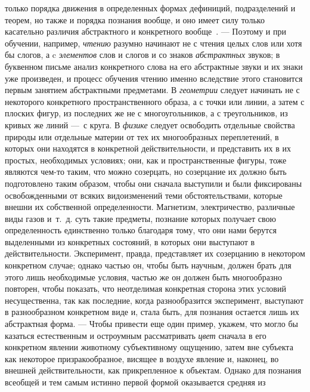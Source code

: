 \documentclass[twoside]{article}
\begin{document}
только порядка движения в определенных формах дефиниций, подразделений и
теорем, но также и порядка познания вообще, и оно имеет силу только
касательно различия абстрактного и конкретного
вообще~\label{bkm:bm106}.
— Поэтому и при обучении, например,
{\em чтению} разумно
начинают не с чтения целых слов или хотя бы слогов, а c
{\em элементов} слов и
слогов и со знаков {\em абстрактных}
звуков; в буквенном письме анализ конкретного слова на его
абстрактные звуки и их знаки уже произведен, и процесс обучения чтению
именно вследствие этого становится первым занятием абстрактными предметами.
В {\em геометрии} следует
начинать не с некоторого конкретного пространственного образа, а с точки
или линии, а затем с плоских фигур, из последних же не с многоугольников, а
с треугольников, из кривых же линий —~с круга. В
{\em физике} следует
освободить отдельные свойства природы или отдельные материи от тех их
многообразных переплетений, в которых они находятся в конкретной
действительности, и представить их в их простых, необходимых условиях; они,
как и пространственные фигуры, тоже являются чем-то таким, что можно
созерцать, но созерцание их должно быть подготовлено таким образом, чтобы
они сначала выступили и были фиксированы освобожденными от всяких
видоизменений теми обстоятельствами, которые внешни их
собственной определенности. Магнетизм, электричество, различные виды газов
и~т.~д. суть такие предметы, познание которых получает свою определенность
единственно только благодаря тому, что они нами берутся выделенными из
конкретных состояний, в которых они выступают в действительности.
Эксперимент, правда, представляет их созерцанию в некотором конкретном
случае; однако частью он, чтобы быть научным, должен брать для этого лишь
необходимые условия, частью же он должен быть многообразно повторен, чтобы
показать, что неотделимая конкретная сторона этих условий несущественна,
так как последние, когда разнообразится эксперимент, выступают в
разнообразном конкретном виде и, стала быть, для познания остается лишь их
абстрактная форма. — Чтобы привести еще один пример, укажем,
что могло бы казаться естественным и остроумным рассматривать
{\em цвет} сначала в его
конкретном явлении животному субъективному ощущению, затем вне субъекта как
некоторое призракообразное, висящее в воздухе явление и, наконец, во
внешней действительности, как прикрепленное к объектам. Однако для познания
всеобщей и тем самым истинно первой формой оказывается средняя из
\end{document}
